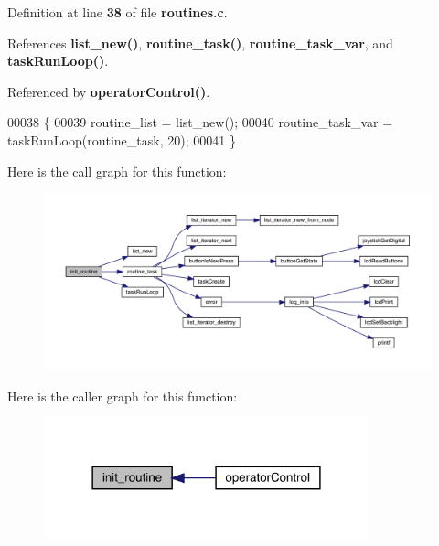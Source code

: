 Definition at line \textbf{ 38} of file \textbf{ routines.\+c}.



References \textbf{ list\+\_\+new()}, \textbf{ routine\+\_\+task()}, \textbf{ routine\+\_\+task\+\_\+var}, and \textbf{ task\+Run\+Loop()}.



Referenced by \textbf{ operator\+Control()}.


\begin{DoxyCode}
00038                     \{
00039   routine_list = list_new();
00040   routine_task_var = taskRunLoop(routine_task, 20);
00041 \}
\end{DoxyCode}
Here is the call graph for this function\+:
\nopagebreak
\begin{figure}[H]
\begin{center}
\leavevmode
\includegraphics[width=350pt]{routines_8c_ab873e24fcc59a2bf7844618b664a5d26_cgraph}
\end{center}
\end{figure}
Here is the caller graph for this function\+:
\nopagebreak
\begin{figure}[H]
\begin{center}
\leavevmode
\includegraphics[width=266pt]{routines_8c_ab873e24fcc59a2bf7844618b664a5d26_icgraph}
\end{center}
\end{figure}
\mbox{\label{routines_8c_a9486ebd51b8c3d966619cf4617e6a930}} 
